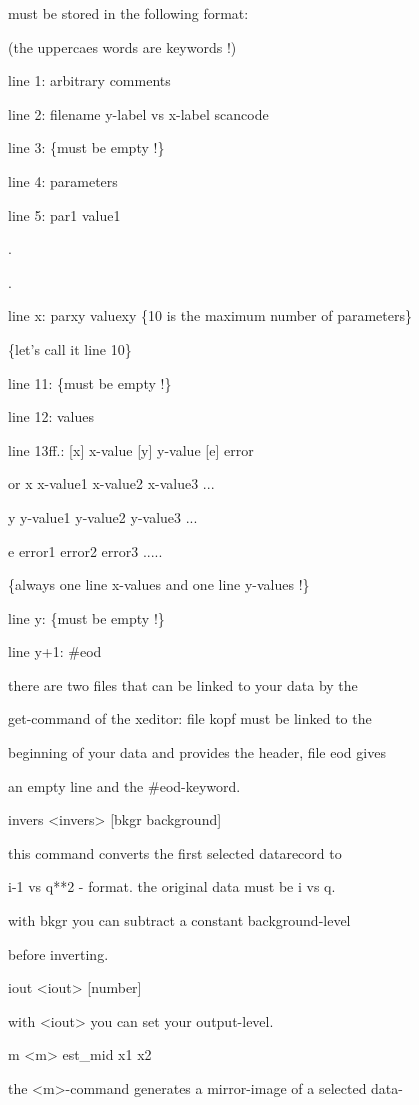 \documentclass[]{article}
\begin{document}
must be stored in the following format:

(the uppercaes words are keywords !)

line 1: arbitrary comments

line 2: filename y-label vs x-label scancode

line 3: \{must be empty !\}

line 4: parameters

line 5: par1 value1

.

.

line x: parxy valuexy \{10 is the maximum number of parameters\}

\{let's call it line 10\}

line 11: \{must be empty !\}

line 12: values

line 13ff.: {[}x{]} x-value {[}y{]} y-value {[}e{]} error

or x x-value1 x-value2 x-value3 ...

y y-value1 y-value2 y-value3 ...

e error1 error2 error3 .....

\{always one line x-values and one line y-values !\}

line y: \{must be empty !\}

line y+1: \#eod

there are two files that can be linked to your data by the

get-command of the xeditor: file kopf must be linked to the

beginning of your data and provides the header, file eod gives

an empty line and the \#eod-keyword.

invers \textless{}invers\textgreater{} {[}bkgr background{]}

this command converts the first selected datarecord to

i-1 vs q**2 - format. the original data must be i vs q.

with bkgr you can subtract a constant background-level

before inverting.

iout \textless{}iout\textgreater{} {[}number{]}

with \textless{}iout\textgreater{} you can set your output-level.

m \textless{}m\textgreater{} est\_mid x1 x2

the \textless{}m\textgreater{}-command generates a mirror-image of a
selected data-
\end{document}
